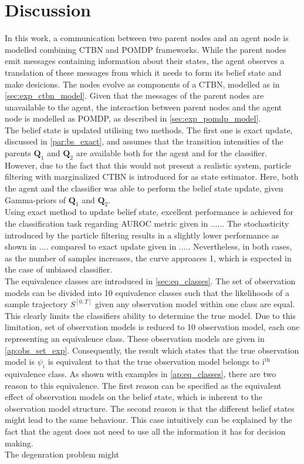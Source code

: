 \chapter{Discussion}
In this work, a communication between two parent nodes and an agent node is modelled combining CTBN and POMDP frameworks. While the parent nodes emit messages containing information about their states, the agent observes a translation of these messages from which it needs to form its belief state and make desicions. The nodes evolve as components of a CTBN, modelled as in \cref{sec:exp_ctbn_model}. Given that the messages of the parent nodes are unavailable to the agent, the interaction between parent nodes and the agent node is modelled as POMDP, as described in \cref{sec:exp_pomdp_model}.\\
The belief state is updated utilising two methods. The first one is exact update, discussed in \cref{par:bs_exact}, and assumes that the transition intensities of the parents $ \textbf{Q}_1 $ and $ \textbf{Q}_2 $ are available both for the agent and for the classifier. However, due to the fact that this would not present a realistic system, particle filtering with marginalized CTBN is introduced for as state estimator. Here, both the agent and the classifier was able to perform the belief state update, given Gamma-priors of $ \textbf{Q}_1 $ and $ \textbf{Q}_2 $.\\
Using exact method to update belief state, excellent performance is achieved for the classification task regarding AUROC metric given in ...... The stochasticity introduced by the particle filtering results in a slightly lower performance as shown in .... compared to exact update given in ..... Nevertheless, in both cases, as the number of samples increases, the curve approaces 1, which is expected in the case of unbiased classifier.\\
The equivalence classes are introduced in \cref{sec:eq_classes}. The set of observation models can be divided into 10 equivalence classes such that the likelihoods of a sample trajectory $ S^{[0,T]} $ given any observation model within one class are equal. This clearly limits the classifiers ability to determine the true model. Due to this limitation, set of observation models is reduced to 10 observation model, each one representing an equivalence class. These observation models are given in \cref{ap:obs_set_exp}. Consequently, the result which states that the true observation model is $ \psi_i $ is equivalent to that the true observation model belongs to $ \text{i}^{\text{th}} $ equivalence class. As shown with examples in \cref{ap:eq_classes}, there are two reason to this equivalence. The first reason can be specified as the equivalent effect of observation models on the belief state, which is inherent to the observation model structure. The second reason is that the different belief states might lead to the same behaviour. This case intuitively can be explained by the fact that the agent does not need to use all the information it has for decision making.\\
The degenration problem might 

